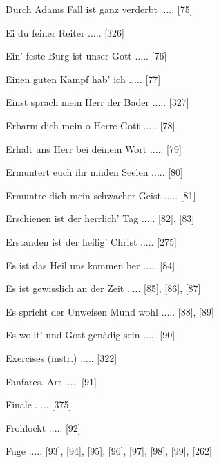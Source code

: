 \documentclass[twocolumn, 12pt]{book}
\begin{document}
\newline 
Durch Adams Fall ist ganz verderbt ..... [75]

\newline 
Ei du feiner Reiter ..... [326]

\newline 
Ein' feste Burg ist unser Gott ..... [76]

\newline 
Einen guten Kampf hab' ich ..... [77]

\newline 
Einst sprach mein Herr der Bader ..... [327]

\newline 
Erbarm dich mein o Herre Gott ..... [78]

\newline 
Erhalt uns Herr bei deinem Wort ..... [79]

\newline 
Ermuntert euch ihr müden Seelen ..... [80]

\newline 
Ermuntre dich mein schwacher Geist ..... [81]

\newline 
Erschienen ist der herrlich' Tag ..... [82], [83]

\newline 
Erstanden ist der heilig' Christ ..... [275]

\newline 
Es ist das Heil uns kommen her ..... [84]

\newline 
Es ist gewisslich an der Zeit ..... [85], [86], [87]

\newline 
Es spricht der Unweisen Mund wohl ..... [88], [89]

\newline 
Es wollt' und Gott genädig sein ..... [90]

\newline 
Exercises (instr.) ..... [322]

\newline 
Fanfares. Arr ..... [91]

\newline 
Finale ..... [375]

\newline 
Frohlockt ..... [92]

\newline 
Fuge ..... [93], [94], [95], [96], [97], [98], [99], [262]
\end{document}
